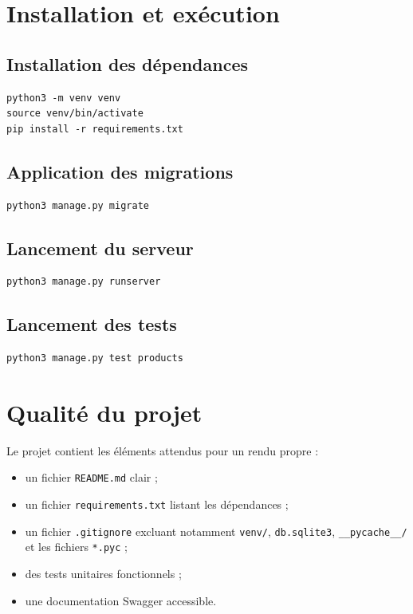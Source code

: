 \documentclass[12pt,a4paper]{article}
\begin{document}
\section{Installation et exécution}

\subsection{Installation des dépendances}

\begin{lstlisting}
python3 -m venv venv
source venv/bin/activate
pip install -r requirements.txt
\end{lstlisting}

\subsection{Application des migrations}

\begin{lstlisting}
python3 manage.py migrate
\end{lstlisting}

\subsection{Lancement du serveur}

\begin{lstlisting}
python3 manage.py runserver
\end{lstlisting}

\subsection{Lancement des tests}

\begin{lstlisting}
python3 manage.py test products
\end{lstlisting}

\section{Qualité du projet}

Le projet contient les éléments attendus pour un rendu propre :

\begin{itemize}
    \item un fichier \texttt{README.md} clair ;
    \item un fichier \texttt{requirements.txt} listant les dépendances ;
    \item un fichier \texttt{.gitignore} excluant notamment \texttt{venv/}, \texttt{db.sqlite3}, \texttt{\_\_pycache\_\_/} et les fichiers \texttt{*.pyc} ;
    \item des tests unitaires fonctionnels ;
    \item une documentation Swagger accessible.
\end{itemize}
\end{document}
